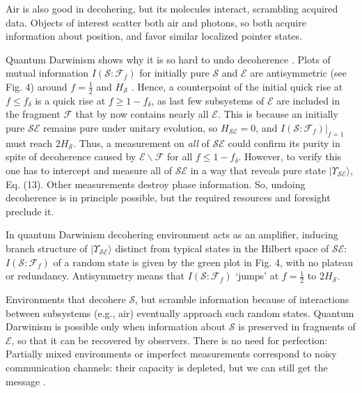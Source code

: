 \documentclass[aps,amsmath,amssymb,amsfonts,floatfix]{revtex4-1}
\newcommand{\ket}[1]    {| #1 \rangle}
\newcommand{\cS}        {{\mathcal S}}
\newcommand{\cE}        {{\mathcal E}}
\newcommand{\+}         {\dagger}
\newcommand\cF{{\mathcal F}}
\begin{document}
{{{Air is also good in decohering, but its molecules interact, scrambling acquired data. Objects of interest scatter both air and photons, so both acquire information about position, and favor similar localized pointer states.

Quantum Darwinism shows why it is so hard to undo decoherence \cite{ZwolakZ}. Plots of mutual information $I(\cS : \cF_f)$ for initially pure $\cS$ and $\cE$ are antisymmetric (see Fig. 4) around $f= \frac 1 2$ and $H_\cS$ \cite{8}. Hence, a counterpoint of the initial quick rise at $f \le f_\delta$ is a quick rise at $f \ge 1 - f_\delta$, as last few subsystems of $\cE$ are included in the fragment $\cF$ that by now contains nearly all $\cE$. 
This is because an initially pure $\cS \cE$ remains pure under unitary evolution, so $H_{\cS \cE}=0$, and $I(\cS : \cF_f)|_{f=1}$ must reach $2 H_{\cS}$. Thus, a measurement on {\it all} of $\cS \cE$ could confirm its purity in spite of decoherence caused by $\cE \backslash \cF$ for all $f \le 1- f_\delta$. 
However, to verify this one has to intercept and measure all of $\cS\cE$ in a way that reveals pure state $\ket {\Upsilon_{\cS\cE}}$, Eq. (13). Other measurements destroy phase 
information. So, undoing decoherence is in principle possible, but the required resources and foresight preclude it.

In quantum Darwinism decohering environment acts as an amplifier,
inducing branch structure of $\ket {\Upsilon_{\cS\cE}}$ distinct from typical states in the Hilbert space of $\cS\cE$: $I(\cS : \cF_f)$ of a random state is given by the green plot in Fig. 4, with no plateau or redundancy. 
Antisymmetry means that $I(\cS : \cF_f)$ `jumps' at $f= \frac 1 2$ to $2 H_{\cS}$. 

Environments that decohere $\cS$, but scramble information because of interactions between  subsystems (e.g., air) eventually approach such random states. Quantum Darwinism is possible only when information about $\cS$ is preserved in fragments of $\cE$, so that it can be recovered by observers. There is no need for perfection: Partially mixed environments or imperfect measurements correspond to noisy communication channels: their capacity is depleted, but we can still get the message \cite{ZwolakQZ1, ZwolakQZ2}.


}}}
\end{document}
